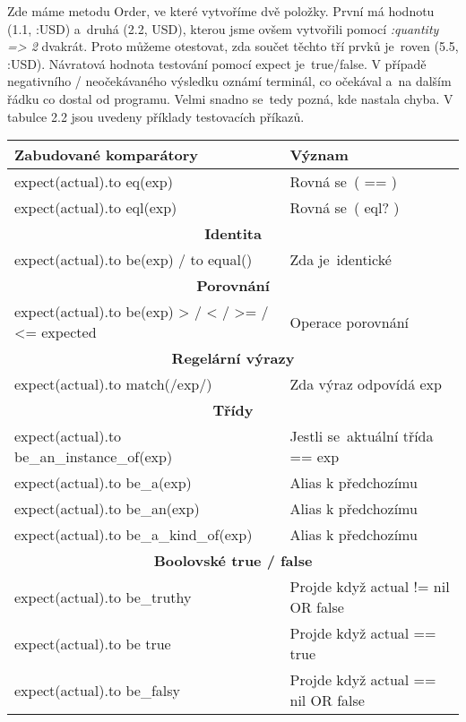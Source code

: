 \par Zde máme metodu Order, ve které vytvoříme dvě položky. První má hodnotu (1.1, :USD) a~druhá (2.2, USD), kterou jsme ovšem vytvořili pomocí \textit{:quantity => 2} dvakrát. Proto můžeme otestovat, zda součet těchto tří prvků je~roven (5.5, :USD). Návratová hodnota testování pomocí expect je~true/false. V případě negativního / neočekávaného výsledku oznámí terminál, co očekával a~na dalším řádku co dostal od programu. Velmi snadno se~tedy pozná, kde nastala chyba. V tabulce 2.2\cite{rspectable} jsou uvedeny příklady testovacích příkazů.

\begin{center}
\begin{longtable}{| m{} | m{} |} 
\hline
 \textbf{Zabudované komparátory} & \textbf{Význam} \\ 
 \hline
 expect(actual).to eq(exp) & Rovná se~( == ) \\
 \hline
 expect(actual).to eql(exp) & Rovná se~( eql? ) \\
 \hline
 \multicolumn{2}{||c||}{\textbf{Identita}}\\
 \hline
 expect(actual).to be(exp) / to equal() & Zda je~identické\\
 \hline
 \multicolumn{2}{||c||}{\textbf{Porovnání}}\\
 \hline
 expect(actual).to be(exp) > / < / >= / <= expected & Operace porovnání \\
 \hline
 \multicolumn{2}{||c||}{\textbf{Regelární výrazy}}\\
 \hline
 expect(actual).to match(/exp/) & Zda výraz odpovídá exp \\
 \hline
 \multicolumn{2}{||c||}{\textbf{Třídy}}\\
 \hline
 expect(actual).to be\_an\_instance\_of(exp) & Jestli se~aktuální třída == exp \\
 \hline
 expect(actual).to be\_a(exp) & Alias k předchozímu \\
 \hline
 expect(actual).to be\_an(exp) & Alias k předchozímu  \\
 \hline
 expect(actual).to be\_a\_kind\_of(exp) & Alias k předchozímu  \\
 \hline
 \multicolumn{2}{||c||}{\textbf{Boolovské true / false}}\\
 \hline
 expect(actual).to be\_truthy  & Projde když actual != nil OR false\\
 \hline
 expect(actual).to be true    & Projde když actual == true \\
 \hline
 expect(actual).to be\_falsy   & Projde když actual == nil OR false \\

\end{longtable}
\end{center}
